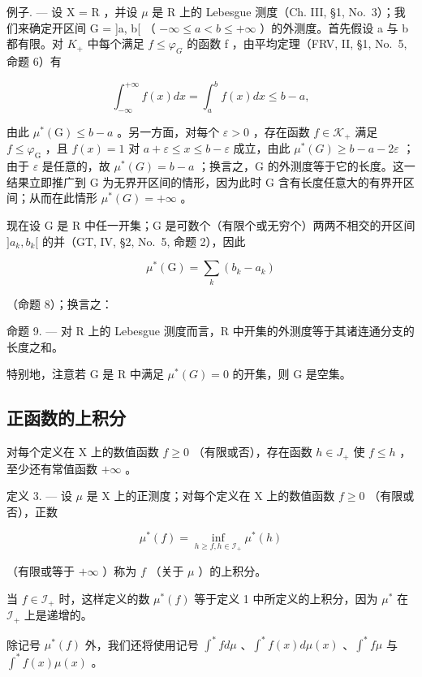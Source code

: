 例子. --- 设 X = R ，并设 \(\mu\) 是 R 上的 Lebesgue 测度（Ch. III, §1, No.~3）；我们来确定开区间 G = {]}a, b{[} （ \(-\infty \leqslant a < b \leqslant +\infty\) ）的外测度。首先假设 a 与 b 都有限。对 \(K_{+}\) 中每个满足 \(f \leqslant \varphi_{G}\) 的函数 f ，由平均定理（FRV, II, §1, No.~5, 命题 6）有

\[
\int_ {- \infty} ^ {+ \infty} f (x) d x = \int_ {a} ^ {b} f (x) d x \leqslant b - a,
\]

由此 \(\mu^{*}(\mathrm{G})\leqslant b - a\) 。另一方面，对每个 \(\varepsilon >0\) ，存在函数 \(f\in \mathcal{K}_{+}\) 满足 \(f\leqslant \varphi_{\mathrm{G}}\) ，且 \(f(x) = 1\) 对 \(a + \varepsilon \leqslant x\leqslant b - \varepsilon\) 成立，由此 \(\mu^{*}(G) \geqslant b - a - 2\varepsilon\) ；由于 \(\varepsilon\) 是任意的，故 \(\mu^{*}(G) = b - a\) ；换言之，G 的外测度等于它的长度。这一结果立即推广到 G 为无界开区间的情形，因为此时 G 含有长度任意大的有界开区间；从而在此情形 \(\mu^{*}(G) = +\infty\) 。

现在设 G 是 R 中任一开集；G 是可数个（有限个或无穷个）两两不相交的开区间 \({]}a_{k}, b_{k}{[}\) 的并（GT, IV, §2, No.~5, 命题 2），因此

\[
\mu^ {*} (\mathrm{G}) = \sum_ {k} (b _ {k} - a _ {k})
\]

（命题 8）；换言之：

命题 9. --- 对 R 上的 Lebesgue 测度而言，R 中开集的外测度等于其诸连通分支的长度之和。

特别地，注意若 G 是 R 中满足 \(\mu^{*}(G)=0\) 的开集，则 G 是空集。

\subsection{正函数的上积分}

对每个定义在 X 上的数值函数 \(f \geqslant 0\) （有限或否），存在函数 \(h \in J_{+}\) 使 \(f \leqslant h\) ，至少还有常值函数 \(+\infty\) 。

定义 3. --- 设 \(\mu\) 是 X 上的正测度；对每个定义在 X 上的数值函数 \(f \geqslant 0\) （有限或否），正数

\[
\mu^ {*} (f) = \inf _ {h \geqslant f, h \in \mathscr {I} _ {+}} \mu^ {*} (h)
\]

（有限或等于 \(+\infty\) ）称为 \(f\) （关于 \(\mu\) ）的上积分。

当 \(f \in \mathcal{I}_+\) 时，这样定义的数 \(\mu^*(f)\) 等于定义 1 中所定义的上积分，因为 \(\mu^*\) 在 \(\mathcal{I}_+\) 上是递增的。

除记号 \(\mu^{*}(f)\) 外，我们还将使用记号 \(\int^{*} f d\mu\) 、\(\int^{*} f(x) d\mu(x)\) 、\(\int^{*} f\mu\) 与 \(\int^{*} f(x)\mu(x)\) 。


